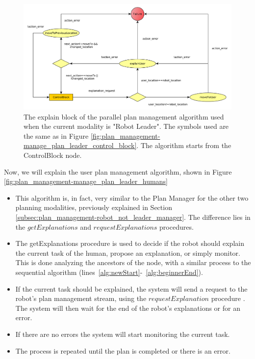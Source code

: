 \begin{figure}[ht!]
 \centering
 \includegraphics[]{img/plan_management/manage_plan_leader_explanation_block.pdf}
 \caption{The explain block of the parallel plan management algorithm used when the current modality is "Robot Leader". The symbols used are the same as in Figure \ref{fig:plan_management-manage_plan_leader_control_block}. The algorithm starts from the ControlBlock node.}
 \label{fig:plan_management-manage_plan_leader_explain_block}
 \end{figure}


Now, we will explain the user plan management algorithm, shown in Figure \ref{fig:plan_management-manage_plan_leader_humans}
\begin{itemize}
\item This algorithm is, in fact, very similar to the Plan Manager for the other two planning modalities, previously explained in Section \ref{subsec:plan_management-robot_not_leader_manager}. The difference lies in the $getExplanations$ and $requestExplanations$ procedures.
\item The getExplanations procedure is used to decide if the robot should explain the current task of the human, propose an explanation, or simply monitor. This is done analyzing the ancestors of the node, with a similar process to the sequential algorithm (lines~\ref{alg:newStart}-~\ref{alg:beginnerEnd}).
\item If the current task should be explained, the system will send a request to the robot's plan management stream, using the $requestExplanation$ procedure . The system will then wait for the end of the robot's explanations or for an error.
\item If there are no errors the system will start monitoring the current task.
\item The process is repeated until the plan is completed or there is an error.
\end{itemize}


